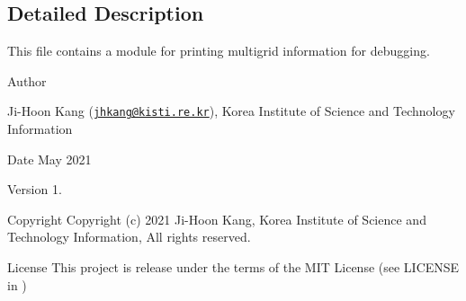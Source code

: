 \subsection{Detailed Description}
This file contains a module for printing multigrid information for debugging. 

\begin{DoxyAuthor}{Author}

\begin{DoxyItemize}
\item Ji-\/\+Hoon Kang (\href{mailto:jhkang@kisti.re.kr}{\tt jhkang@kisti.\+re.\+kr}), Korea Institute of Science and Technology Information
\end{DoxyItemize}
\end{DoxyAuthor}
\begin{DoxyDate}{Date}
May 2021 
\end{DoxyDate}
\begin{DoxyVersion}{Version}
1. 
\end{DoxyVersion}
\begin{DoxyParagraph}{Copyright}
Copyright (c) 2021 Ji-\/\+Hoon Kang, Korea Institute of Science and Technology Information, All rights reserved. 
\end{DoxyParagraph}
\begin{DoxyParagraph}{License }
This project is release under the terms of the M\+IT License (see L\+I\+C\+E\+N\+SE in ) 
\end{DoxyParagraph}
